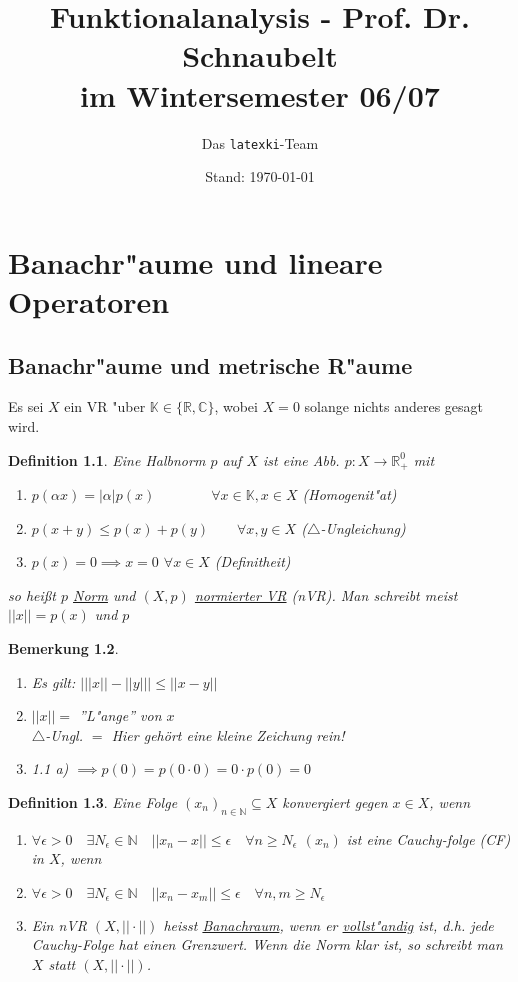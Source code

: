 \documentclass[a4paper,11pt]{book}
\title{Funktionalanalysis - Prof. Dr. Schnaubelt\\
		im Wintersemester 06/07}
\author{Das \texttt{latexki}-Team\\[8 cm]}
\date{Stand: \today}
\def\folgt{\ensuremath{\implies}}
\newtheorem{Def}{Definition}[chapter]
\newtheorem{Bem}[Def]{Bemerkung}
\theoremstyle{nonumberplain}
\begin{document}
\maketitle

\chapter{Banachr"aume und lineare Operatoren}

\section{Banachr"aume und metrische R"aume}

Es sei $X$ ein VR "uber $\mathbb{K}\in \{\mathbb{R},\mathbb{C}\}$, wobei $X={0}$ solange nichts anderes gesagt wird.
\begin{Def}%
Eine Halbnorm $p$ auf $X$ ist eine Abb. $p:X\rightarrow\mathbb{R}_{+}^{0}$ mit
	\begin{enumerate}
		\item [(a)] $p(\alpha x) = |\alpha|p(x) \qquad\qquad\forall 
		x\in\mathbb{K},x\in X$ (Homogenit"at)
		\item [(b)] $p(x+y)\leq p(x)+p(y) \qquad\forall x,y\in X$ 
		($\triangle$-Ungleichung)
		\item [(c)] $p(x)=0 \folgt x=0$ \qquad\qquad$\forall x\in X$ (Definitheit)
	
	\end{enumerate}
so hei\ss t $p$ \underline{Norm} und $(X,p)$ \underline{normierter VR} (nVR).
Man schreibt meist $||x||=p(x)$ und $p$
\end{Def}
\begin{Bem}
	\begin{enumerate}
	\item [(a)] 	Es gilt: $\mid ||x||-||y|| \mid \leq ||x-y||$
	\item [(b)] 	$||x|| =$ ''L"ange'' von $x$\\
					$\triangle$-Ungl. $=$ Hier gehört eine kleine Zeichung rein!
	\item [(c)] 1.1 a) $\folgt p(0)=p(0\cdot 0)=0\cdot p(0)=0$
	
	\end{enumerate}
\end{Bem}
\begin{Def}%
	Eine Folge $(x_{n})_{n\in \mathbb{N}} \subseteq X$ konvergiert gegen $x\in X$, wenn 
	\begin{enumerate}
	\item [(1.1)] $\forall \epsilon >0\quad \exists N_{\epsilon} \in \mathbb{N}\quad ||x_{n}-x||  \leq \epsilon \quad \forall n \geq N_{\epsilon}$ $(x_{n})$ ist eine Cauchy-folge (CF) in $X$, wenn
	\item [(1.2)] $\forall \epsilon >0 \quad \exists N_{\epsilon} \in \mathbb{N}\quad ||x_{n}-x_{m}|| \leq \epsilon \quad \forall n,m \geq N_{\epsilon}$
	\item [] Ein nVR $(X,||\cdot||)$ heisst \underline{Banachraum}, wenn er \underline{vollst"andig} ist, d.h. jede Cauchy-Folge hat einen Grenzwert. Wenn die Norm klar ist, so schreibt man $X$ statt $(X,||\cdot||)$.

	\end{enumerate}
\end{Def}
\end{document}
